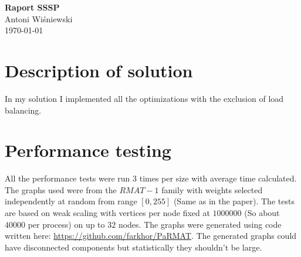 \documentclass[a4paper,13pt,nontitlepage,onecolumn]{mwart}
\begin{document}
\Large\textbf{Raport SSSP}\\
\large{Antoni Wiśniewski}\\
\large{\today}

\large{
\vspace{.5cm}
\section{Description of solution}
In my solution I implemented all the optimizations with the exclusion of load balancing.

\section{Performance testing}
All the performance tests were run 3 times per size with average time calculated. The graphs used were from the $RMAT-1$ family with weights selected independently at random from range $[0, 255]$ (Same as in the paper). The tests are based on weak scaling with vertices per node fixed at $1000 000$ (So about $40 000$ per process) on up to $32$ nodes. The graphs were generated using code written here: \url{https://github.com/farkhor/PaRMAT}. The generated graphs could have disconnected components but statistically they shouldn't be large.
}
\end{document}
